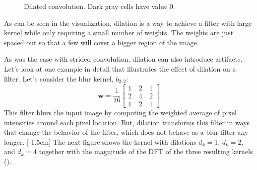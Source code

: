 \begin{figure}[h!]
{
    }
    \caption{Dilated convolution. Dark gray cells have value 0.}
    \label{fig:convolutional_neural_networks:dilated_conv_diagram}
\end{figure}

As can be seen in the visualization, dilation is a way to achieve a filter with large kernel while only requiring a small number of weights. The weights are just spaced out so that a few will cover a bigger region of the image.

As was the case with strided convolution, dilation can also introduce artifacts. Let's look at one example in detail that illustrates the effect of dilation on a filter. Let's consider the blur kernel, $b_{2,2}$:
\begin{equation}
    \mathbf{w} = \frac{1}{16}
    \begin{bmatrix}
        1 ~ & 2 ~ & 1 \\
        2 ~ & 4 ~ & 2 \\
        1~  & 2 ~ & 1
    \end{bmatrix}
\end{equation}
This filter blurs the input image by computing the weighted average of pixel intensities around each pixel location. But, dilation transforms this filter in ways that change the behavior of the filter, which does not behave as a blur filter any longer.
[-1.5cm]
The next figure shows the kernel with dilations $d_k=1$, $d_k=2$, and $d_k=4$ together with the magnitude of the DFT of the three resulting kernels (\fig{\ref{fig:convolutional_neural_nets:aliasing_dilated_kernel_binomial}}).



